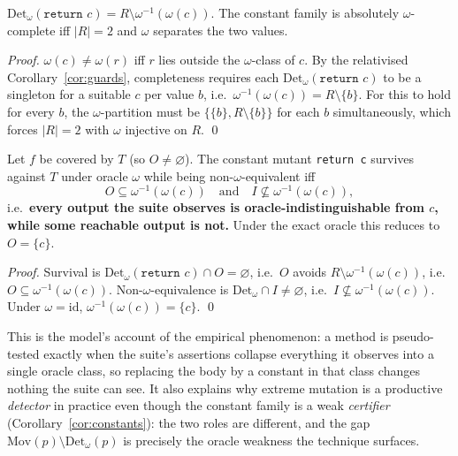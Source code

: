 \documentclass[runningheads,envcountsect,envcountsame]{llncs}
\newcommand{\Mov}{\mathrm{Mov}}
\newcommand{\DetW}{\mathrm{Det}_{\omega}}
\begin{document}
\begin{proposition}
\label{prop:oconst}
$\DetW(\texttt{return } c) = R \setminus \omega^{-1}(\omega(c))$. The constant
family is absolutely $\omega$-complete iff $|R| = 2$ and $\omega$ separates the
two values.
\end{proposition}

\begin{proof}
$\omega(c) \neq \omega(r)$ iff $r$ lies outside the $\omega$-class of $c$. By the
relativised Corollary~\ref{cor:guards}, completeness requires each
$\DetW(\texttt{return } c)$ to be a singleton for a suitable $c$ per value $b$,
i.e.\ $\omega^{-1}(\omega(c)) = R \setminus \{b\}$. For this to hold for every
$b$, the $\omega$-partition must be $\{\{b\}, R \setminus \{b\}\}$ for each $b$
simultaneously, which forces $|R| = 2$ with $\omega$ injective on $R$. \qed
\end{proof}

\begin{proposition}
\label{prop:pseudo}
Let $f$ be covered by $T$ (so $O \neq \varnothing$). The constant mutant
\texttt{return c} survives against $T$ under oracle $\omega$ while being
non-$\omega$-equivalent iff
\[
  O \subseteq \omega^{-1}(\omega(c)) \quad\text{and}\quad
  I \not\subseteq \omega^{-1}(\omega(c)),
\]
i.e.\ \textbf{every output the suite observes is oracle-indistinguishable from
$c$, while some reachable output is not.} Under the exact oracle this reduces to
$O = \{c\}$.
\end{proposition}

\begin{proof}
Survival is $\DetW(\texttt{return } c) \cap O = \varnothing$, i.e.\ $O$ avoids
$R \setminus \omega^{-1}(\omega(c))$, i.e.\ $O \subseteq \omega^{-1}(\omega(c))$.
Non-$\omega$-equivalence is $\DetW \cap I \neq \varnothing$, i.e.\
$I \not\subseteq \omega^{-1}(\omega(c))$. Under $\omega = \mathrm{id}$,
$\omega^{-1}(\omega(c)) = \{c\}$. \qed
\end{proof}

This is the model's account of the empirical phenomenon: a method is
pseudo-tested exactly when the suite's assertions collapse everything it observes
into a single oracle class, so replacing the body by a constant in that class
changes nothing the suite can see. It also explains why extreme mutation is a
productive \emph{detector} in practice even though the constant family is a weak
\emph{certifier} (Corollary~\ref{cor:constants}): the two roles are different,
and the gap $\Mov(p) \setminus \DetW(p)$ is precisely the oracle weakness the
technique surfaces.
\end{document}
